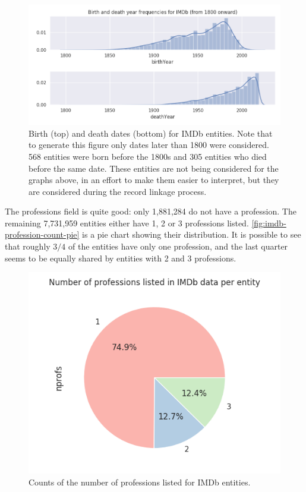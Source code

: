 \documentclass[epsfig,a4paper,11pt,titlepage,twoside,openany]{book}
\begin{document}
\begin{figure}[H]
  \centering \includegraphics[width=.9\textwidth]{birth_and_death_frequencies_imdb}
  \caption{Birth (top) and death dates (bottom) for IMDb entities. Note that to generate this figure only dates later than 1800 were considered. 568 entities were born before the 1800s and 305 entities who died before the same date. These entities are not being considered for the graphs above, in an effort to make them easier to interpret, but they are considered  during the record linkage process.}
  \label{fig:imdb-years-distplot}
\end{figure}

The professions field is quite good: only 1,881,284 do not have a profession. The remaining 7,731,959 entities either have 1, 2 or 3 professions listed. \autoref{fig:imdb-profession-count-pie} is a pie chart showing their distribution. It is possible to see that roughly $3/4$ of the entities have only one profession, and the last quarter seems to be equally shared by entities with 2 and 3 professions.

\begin{figure}[H]
  \centering \includegraphics[width=.6\textwidth]{profession_counts_imdb}
  \caption{Counts of the number of professions listed for IMDb entities.}
  \label{fig:imdb-profession-count-pie}
\end{figure}
\end{document}

